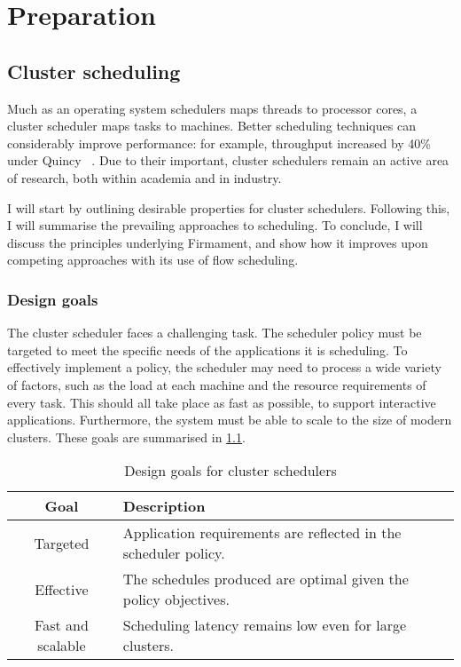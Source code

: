 \chapter{Preparation} \label{chap:prep}


\section{Cluster scheduling} \label{sec:prep-scheduling}


Much as an operating system schedulers maps threads to processor cores, a cluster scheduler maps tasks to machines. Better scheduling techniques can considerably improve performance: for example, throughput increased by 40\% under Quincy ~\cite{Isard:2009}. Due to their important, cluster schedulers remain an active area of research, both within academia and in industry.

I will start by outlining desirable properties for cluster schedulers. Following this, I will summarise the prevailing approaches to scheduling. To conclude, I will discuss the principles underlying Firmament, and show how it improves upon competing approaches with its use of flow scheduling.

\subsection{Design goals} \label{sec:prep-scheduling-goals}


The cluster scheduler faces a challenging task. The scheduler policy must be targeted to meet the specific needs of the applications it is scheduling. To effectively implement a policy, the scheduler may need to process a wide variety of factors, such as the load at each machine and the resource requirements of every task. This should all take place as fast as possible, to support interactive applications. Furthermore, the system must be able to scale to the size of modern clusters. These goals are summarised in \cref{table:cluster-scheduler-design-goals}.

\begin{table}
    \begin{tabular}{c|l}
        Goal & Description\tabularnewline
        \hline
        Targeted & Application requirements are reflected in the scheduler policy. \tabularnewline
        Effective & The schedules produced are optimal given the policy objectives. \tabularnewline
        Fast and scalable & Scheduling latency remains low even for large clusters. \tabularnewline
    \end{tabular}
    \caption{Design goals for cluster schedulers}
    \label{table:cluster-scheduler-design-goals}
\end{table}

